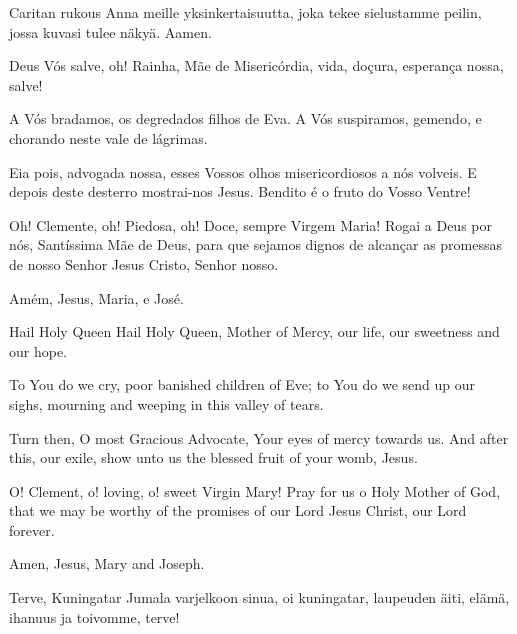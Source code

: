 \begin{songs}{}
\begin{passage}[FI]{Caritan rukous}
          Anna meille yksinkertaisuutta, joka tekee sielustamme peilin,
          jossa kuvasi tulee näkyä.
          Aamen.
        \end{passage}
      \endsong
      \scleardpage
        \begin{passage}[PT]{}
          Deus Vós salve, oh! Rainha, Mãe de Misericórdia,
          vida, doçura, esperança nossa, salve!
          \par
          A Vós bradamos, os degredados filhos de Eva.
          A Vós suspiramos, gemendo, e chorando neste
          vale de lágrimas.
          \par
          Eia pois, advogada nossa, esses Vossos olhos
          misericordiosos a nós volveis.
          E depois deste desterro mostrai-nos Jesus.
          Bendito é o fruto do Vosso Ventre!
          \par
          Oh! Clemente, oh! Piedosa, oh! Doce, sempre
          Virgem Maria!
          Rogai a Deus por nós, Santíssima Mãe de Deus,
          para que sejamos dignos de alcançar as promessas
          de nosso Senhor Jesus Cristo, Senhor nosso.
          \par
          Amém, Jesus, Maria, e José.
        \end{passage}
        \hardbrk
        \begin{passage}[EN]{Hail Holy Queen}
          Hail Holy Queen, Mother of Mercy, our life, our
          sweetness and our hope.
          \par
          To You do we cry, poor banished children of Eve;
          to You do we send up our sighs, mourning and
          weeping in this valley of tears.
          \par
          Turn then, O most Gracious Advocate, Your eyes
          of mercy towards us. And after this, our exile, show unto us the
          blessed fruit of your womb, Jesus.
          \par
          O! Clement, o! loving, o! sweet Virgin Mary!
          Pray for us o Holy Mother of God, that we may
          be worthy of the promises of our Lord Jesus Christ,
          our Lord forever.
          \par
          Amen, Jesus, Mary and Joseph.
        \end{passage}
        \begin{passage}[FI]{Terve, Kuningatar}
          Jumala varjelkoon sinua, oi kuningatar, laupeuden äiti, elämä, ihanuus ja toivomme, terve!
          \par

\end{passage}
\end{songs}
